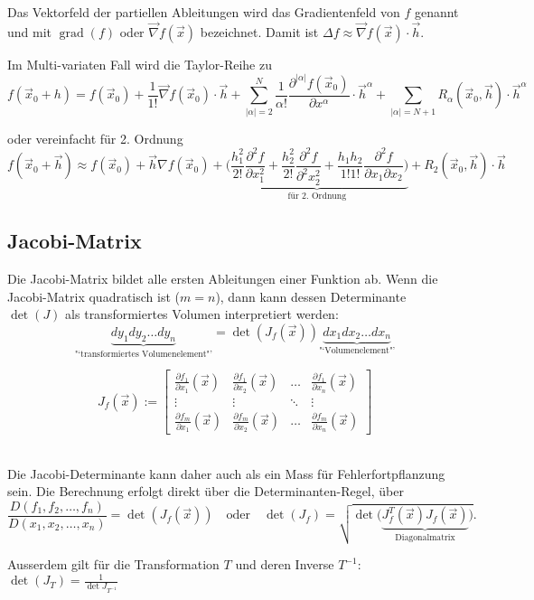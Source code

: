   Das Vektorfeld der partiellen Ableitungen wird das Gradientenfeld von $f$ genannt und mit $\operatorname{grad}(f)$ oder $\vec{\nabla} f(\vec{x})$ bezeichnet.
  Damit ist $\Delta f \approx \vec{\nabla} f(\vec{x}) \cdot \vec{h}$.

  Im Multi-variaten Fall wird die Taylor-Reihe zu
  \[
      f(\vec{x}_0+h) = f(\vec{x}_0) + \frac{1}{1!}\vec{\nabla}f(\vec{x}_0) \cdot \vec{h}
       + \sum\limits_{|\alpha|=2}^N \frac{1}{\alpha!}\frac{\partial^{|\alpha|} f(\vec{x}_0)}{\partial x^{\alpha}} \cdot \vec{h}^{\alpha}
       + \sum\limits_{|\alpha|=N+1} R_{\alpha}(\vec{x}_0,\vec{h}) \cdot \vec{h}^{\alpha}
  \]
  
  oder vereinfacht für 2. Ordnung
  \[
      f(\vec{x}_0 + \vec{h}) \approx f(\vec{x}_0) + \vec{h} \nabla f(\vec{x}_0) +
      \underbrace{\bigg( \frac{h_1^2}{2!} \frac{\partial^2 f}{\partial x_1^2} + \frac{h_2^2}{2!} \frac{\partial^2 f}{\partial^2 x_2^2}
      + \frac{h_1 h_2}{1!1!} \frac{\partial^2 f}{\partial x_1 \partial x_2}\bigg)}_{\text{für 2. Ordnung}} + R_2(\vec{x}_0, \vec{h}) \cdot \vec{h}
  \]
  
\subsection{Jacobi-Matrix}
  \begin{minipage}{12cm}
    Die Jacobi-Matrix bildet alle ersten Ableitungen einer Funktion ab.
    Wenn die Jacobi-Matrix quadratisch ist ($m=n$), dann kann dessen Determinante $\det(J)$ als 
    transformiertes Volumen interpretiert werden:
    \[
        \underbrace{dy_1 dy_2 \ldots dy_n}_{\text{"`transformiertes Volumenelement"'}} = 
        \det(J_f(\vec{x})) \underbrace{dx_1 dx_2 \ldots dx_n}_{\text{"`Volumenelement"'}}
    \]
  \end{minipage}
  \begin{minipage}{6cm}
    \[
        J_f(\vec{x}) :=  \begin{bmatrix}
        \frac{\partial f_1}{\partial x_1}(\vec{x}) & \frac{\partial f_1}{\partial x_2}(\vec{x}) & \ldots & \frac{\partial f_1}{\partial x_n}(\vec{x}) \\
        \vdots & \vdots & \ddots & \vdots \\
        \frac{\partial f_m}{\partial x_1}(\vec{x}) & \frac{\partial f_m}{\partial x_2}(\vec{x}) & \ldots & \frac{\partial f_m}{\partial x_n} (\vec{x})
        \end{bmatrix}
    \]
  \end{minipage} \\
  
    Die Jacobi-Determinante kann daher auch als ein Mass für Fehlerfortpflanzung sein.
    Die Berechnung erfolgt direkt über die Determinanten-Regel, über 
    $$\frac{D(f_1, f_2, \ldots,f_n)}{D(x_1, x_2, \ldots, x_n)} = \det(J_f(\vec{x})) \quad \text{oder} \quad
    \det(J_f) = \sqrt{\det \Big( \underbrace{J_f^T(\vec{x}) J_f(\vec{x})}_{\text{Diagonalmatrix}} \Big)}.$$
    
    Ausserdem gilt für die Transformation $T$ und deren Inverse $T^{-1}$: $\det(J_T) = \frac{1}{\det{J_{T^{-1}}}}$
  \hspace{5mm}

  